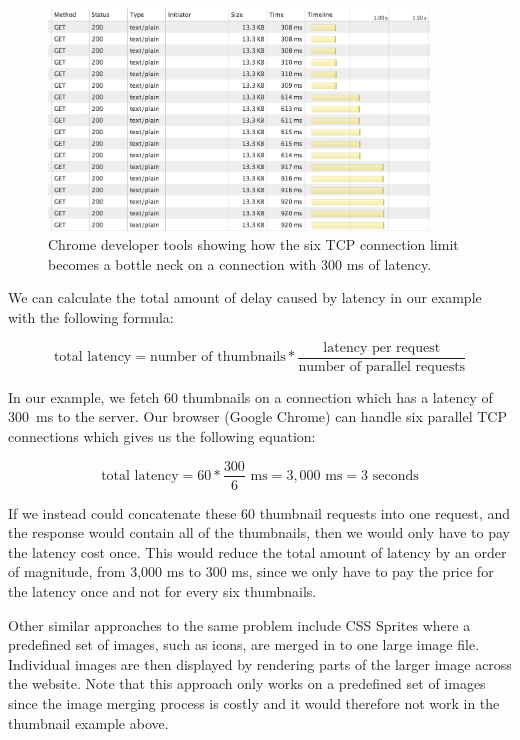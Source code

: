 \documentclass{cslthse-msc}
\begin{document}
\begin{figure}[H]
  \centering
    \begin{center}
      \includegraphics[width=0.9\textwidth]{images/chrome_latency_limit.png}
    \end{center}
  \caption{Chrome developer tools showing how the six TCP connection limit becomes a bottle neck on a connection with 300 ms of latency.}
  \label{fig:tcp_bottleneck}
\end{figure}

We can calculate the total amount of delay caused by latency in our example with the following formula:

\begin{equation}
\mbox{total latency} = \mbox{number of thumbnails} * \frac{\mbox{latency per request}}{\mbox{number of parallel requests}}
\end{equation}

In our example, we fetch 60 thumbnails on a connection which has a latency of 300~ms to the server. Our browser (Google Chrome) can handle six parallel TCP connections which gives us the following equation:

\begin{equation}
\mbox{total latency} = 60 * \frac{300}{6} \mbox{ ms}= 3,000 \mbox{ ms} = 3 \mbox{ seconds}
\end{equation}

If we instead could concatenate these 60 thumbnail requests into one request, and the response would contain all of the thumbnails, then we would only have to pay the latency cost once. This would reduce the total amount of latency by an order of magnitude, from 3,000 ms to 300 ms, since we only have to pay the price for the latency once and not for every six thumbnails.

Other similar approaches to the same problem include CSS Sprites \cite{css_sprites} where a predefined set of images, such as icons, are merged in to one large image file. Individual images are then displayed by rendering parts of the larger image across the website. Note that this approach only works on a predefined set of images since the image merging process is costly and it would therefore not work in the thumbnail example above.
\end{document}
